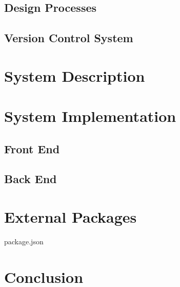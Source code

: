 \documentclass[a4wide, 11pt]{article}
\begin{document}
\subsection {Design Processes}
\subsection {Version Control System}

\section {System Description}

\section {System Implementation}
\subsection {Front End}
\subsection {Back End}

\section {External Packages}

package.json

\section {Conclusion}
\end{document}
